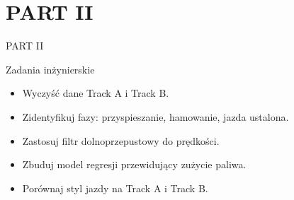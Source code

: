 \documentclass[aspectratio=169]{beamer}
\begin{document}
\section{PART II}
\begin{frame}[plain]
  \begin{center}
    \vspace{2cm}
    {\color{white}\Huge PART II}
  \end{center}
\end{frame}

\begin{frame}{Zadania inżynierskie}
  \begin{itemize}
    \item Wyczyść dane Track A i Track B.
    \item Zidentyfikuj fazy: przyspieszanie, hamowanie, jazda ustalona.
    \item Zastosuj filtr dolnoprzepustowy do prędkości.
    \item Zbuduj model regresji przewidujący zużycie paliwa.
    \item Porównaj styl jazdy na Track A i Track B.
  \end{itemize}
\end{frame}

\end{document}
